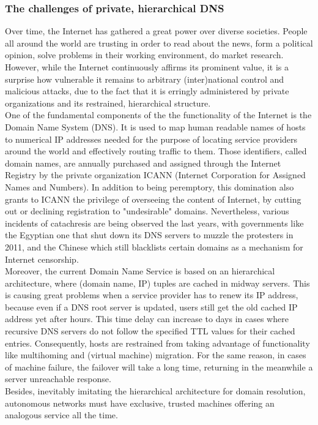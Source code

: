 \documentclass[12pt,a4paper,oneside]{article}
\begin{document}
\subsubsection{The challenges of private, hierarchical DNS}
Over time, the Internet has gathered a great power over diverse societies.
People all around the world are trusting in order to read about the news, form a political opinion, solve problems in their working environment, do market research.
However, while the Internet continuously affirms its prominent value, it is a surprise how vulnerable it remains to arbitrary (inter)national control and malicious attacks, due to the fact that it is erringly administered by private organizations and its restrained, hierarchical structure. \\
\indent One of the fundamental components of the the functionality of the Internet is the Domain Name System (DNS).
It is used to map human readable names of hosts to numerical IP addresses needed for the purpose of locating service providers around the world and effectively routing traffic to them.
Those identifiers, called domain names, are annually purchased and assigned through the Internet Registry by the private organization ICANN (Internet Corporation for Assigned Names and Numbers).
In addition to being peremptory, this domination also grants to ICANN the privilege of overseeing the content of Internet, by cutting out or declining registration to "undesirable" domains.
Nevertheless, various incidents of catachresis are being observed the last years, with governments like the Egyptian one that shut down its DNS servers to muzzle the protesters in 2011, and the Chinese which still blacklists certain domains as a mechanism for Internet censorship.\\
\indent Moreover, the current Domain Name Service is based on an hierarchical architecture, where (domain name, IP) tuples are cached in midway servers.
This is causing great problems when a service provider has to renew its IP address, because even if a DNS root server is updated, users still get the old cached IP address yet after hours.
This time delay can increase to days in cases where recursive DNS servers do not follow the specified TTL values for their cached entries.
Consequently, hosts are restrained from taking advantage of functionality like multihoming and (virtual machine) migration.
For the same reason, in cases of machine failure, the failover will take a long time, returning in the meanwhile a server unreachable response. \\
\indent Besides, inevitably imitating the hierarchical architecture for domain resolution, autonomous networks must have exclusive, trusted machines offering an analogous service all the time.
\end{document}

